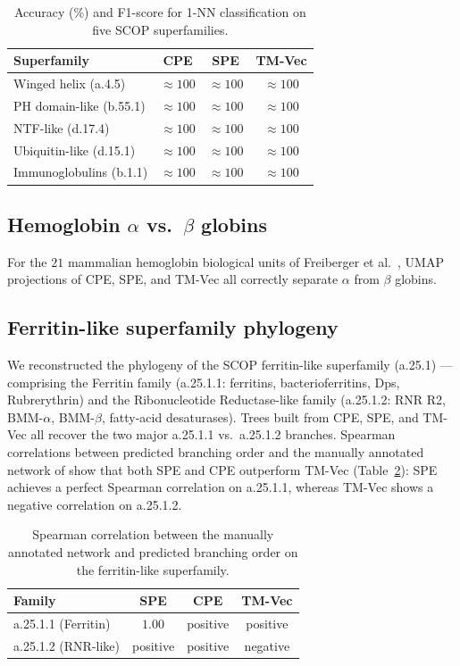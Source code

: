 \documentclass[11pt]{article}
\begin{document}
\begin{table}[h]
\centering
\caption{Accuracy (\%) and F1-score for 1-NN classification on five SCOP superfamilies.}
\label{tab:scopsf}
\begin{tabular}{lccc}
\toprule
Superfamily & CPE & SPE & TM-Vec \\
\midrule
Winged helix (a.4.5) & $\approx 100$ & $\approx 100$ & $\approx 100$ \\
PH domain-like (b.55.1) & $\approx 100$ & $\approx 100$ & $\approx 100$ \\
NTF-like (d.17.4) & $\approx 100$ & $\approx 100$ & $\approx 100$ \\
Ubiquitin-like (d.15.1) & $\approx 100$ & $\approx 100$ & $\approx 100$ \\
Immunoglobulins (b.1.1) & $\approx 100$ & $\approx 100$ & $\approx 100$ \\
\bottomrule
\end{tabular}
\end{table}

\subsection{Hemoglobin $\alpha$ vs.\ $\beta$ globins}
For the $21$ mammalian hemoglobin biological units of Freiberger et al.~\cite{freiberger2023frustration}, UMAP projections of CPE, SPE, and TM-Vec all correctly separate $\alpha$ from $\beta$ globins.

\subsection{Ferritin-like superfamily phylogeny}
We reconstructed the phylogeny of the SCOP ferritin-like superfamily (a.25.1) --- comprising the Ferritin family (a.25.1.1: ferritins, bacterioferritins, Dps, Rubrerythrin) and the Ribonucleotide Reductase-like family (a.25.1.2: RNR R2, BMM-$\alpha$, BMM-$\beta$, fatty-acid desaturases). Trees built from CPE, SPE, and TM-Vec all recover the two major a.25.1.1 vs.\ a.25.1.2 branches. Spearman correlations between predicted branching order and the manually annotated network of \cite{malik2014ferritin,puente2022ferritin} show that both SPE and CPE outperform TM-Vec (Table~\ref{tab:spear}): SPE achieves a perfect Spearman correlation on a.25.1.1, whereas TM-Vec shows a negative correlation on a.25.1.2.

\begin{table}[h]
\centering
\caption{Spearman correlation between the manually annotated network and predicted branching order on the ferritin-like superfamily.}
\label{tab:spear}
\begin{tabular}{lccc}
\toprule
Family & SPE & CPE & TM-Vec \\
\midrule
a.25.1.1 (Ferritin) & $1.00$ & positive & positive \\
a.25.1.2 (RNR-like) & positive & positive & negative \\
\bottomrule
\end{tabular}
\end{table}
\end{document}
